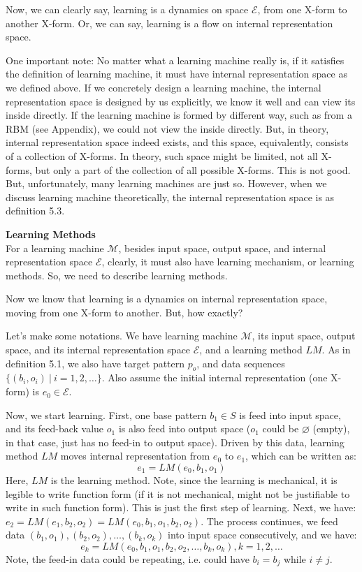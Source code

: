 Now, we can clearly say, learning is a dynamics on space $\mathcal{E}$, from one X-form to another X-form. Or, we can say, learning is a flow on internal representation space. 

One important note: No matter what a learning machine really is, if it satisfies the definition of learning machine, it must have internal representation space as we defined above. If we concretely design a learning machine,  the internal representation space is designed by us explicitly, we know it well and can view its inside directly. If the learning machine is formed by different way, such as from a RBM (see Appendix), we could not view the inside directly. But, in theory, internal representation space indeed exists, and this space, equivalently, consists of a collection of X-forms. In theory, such space might be limited, not all X-forms, but only a part of the collection of all possible X-forms. This is not good. But, unfortunately, many learning machines are just so. However, when we discuss learning machine theoretically, the internal representation space is as definition 5.3.  
\bigskip





{\bf Learning Methods} \\
For a learning machine $\mathcal{M}$, besides input space, output space, and internal representation space $\mathcal{E}$, clearly, it must also have learning mechanism, or learning methods. So, we need to describe learning methods.


Now we know that learning is a dynamics on internal representation space, moving from one X-form to another. But, how exactly? 




Let's make some notations. We have learning machine $\mathcal{M}$, its input space, output space, and its internal representation space $\mathcal{E}$, and a learning method $LM$. As in definition 5.1, we also have target pattern $p_o$, and data sequences $\{(b_i, o_i) \ | \ i = 1,2,\ldots\}$. Also assume the initial internal representation (one X-form)  is $e_0 \in \mathcal{E}$. 

Now, we start learning. First, one base pattern $b_1 \in S$ is feed into input space, and its feed-back value $o_1$ is also feed into output space ($o_1$ could be $\varnothing$ (empty), in that case, just has no feed-in to output space). Driven by this data, learning method $LM$ moves internal representation from $e_0$ to $e_1$, which can be written as:
$$
e_1 = LM(e_0, b_1, o_1 ) 
$$
Here, $LM$ is the learning method. Note, since the learning is mechanical, it is legible to write function form (if it is not mechanical, might not be justifiable to write in such function form). This is just the first step of learning. Next, we have: $e_2 = LM(e_1, b_2, o_2) = LM(e_0, b_1, o_1,  b_2, o_2)$. The process continues, we feed data  $(b_1, o_1), (b_2, o_2), \ldots, (b_k, o_k)$ into input space consecutively, and we have: 
\[
e_k = LM(e_0, b_1, o_1, b_2, o_2, \ldots, b_k, o_k ), k = 1, 2, \ldots  \label{eq:lmk} \tag{lm}  
\]
Note, the feed-in data could be repeating, i.e. could have $b_i = b_j$ while $i \ne j$.

